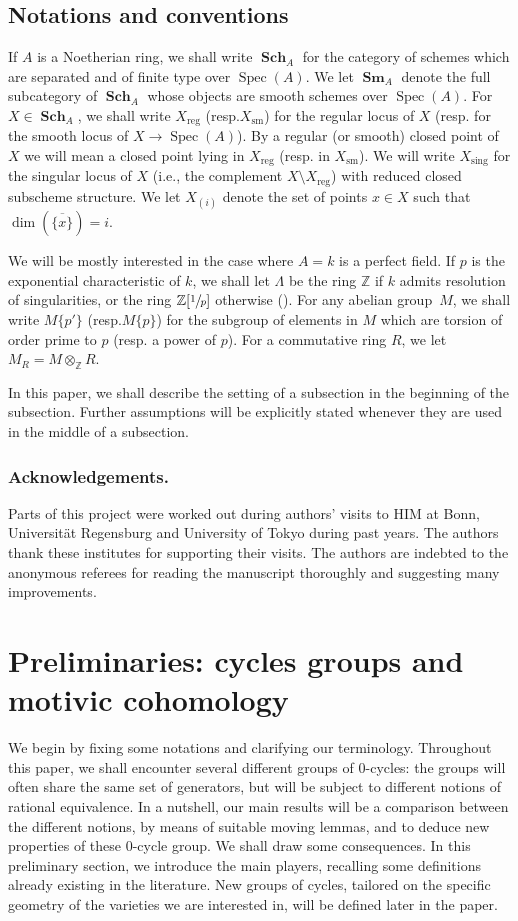 \documentclass[11pt]{article}
\newcommand{\resp}{resp.\xspace}
\numberwithin{equation}{section}
\newcommand{\sm}{\mathrm{sm}}
\theoremstyle{definition}
\newcommand{\Z}{{\mathbb Z}}
\DeclareMathOperator{\Sch}{\mathbf{Sch}}
\DeclareMathOperator{\Sm}{\mathbf{Sm}}
\DeclareMathOperator{\Spec}{Spec}
\newcommand{\reg}{\mathrm{reg}}
\newcommand{\sing}{\mathrm{sing}}
\let\ov\overline
\begin{document}
\subsection*{Notations and conventions}
If $A$ is a Noetherian ring, we shall write $\Sch_A$ for the category
of schemes which are separated and of finite type over $\Spec(A)$.
We let $\Sm_A$ denote the full subcategory of $\Sch_A$ whose objects
are smooth schemes over $\Spec(A)$. For $X\in \Sch_A$, we shall write $X_{\reg}$ (\resp $X_{\sm}$) for the regular locus of $X$ (\resp for the smooth locus of $X\to \Spec(A)$). By a regular (or smooth) closed point of $X$ we will mean a closed point lying in $X_{\reg}$ (\resp in $X_{\sm}$). We will write $X_{\sing}$ for the singular locus of $X$ (i.e., the complement $X \setminus X_{\reg}$) with reduced closed subscheme structure. We let $X_{(i)}$ denote the set of points $x \in X$ such that
$\dim(\ov{\{x\}}) = i$.

We will be mostly interested in the case where $A = k$ is a perfect field.
If $p$ is the exponential characteristic of $k$,
we shall let $\Lambda$ be the ring $\Z$ if $k$ admits resolution of
singularities, or the ring $\Z[\sfrac{1}{p}]$ otherwise (\cite[Def.\,3.4]{FV}).
For any abelian group~$M$, we shall write $M\{p'\}$ (\resp $M\{p\}$) for the subgroup of elements in $M$ which are torsion of order prime to $p$ (\resp a power of $p$). For a commutative ring $R$, we let
$M_R = M \otimes_\Z R$.

In this paper, we shall describe the setting of a subsection in the beginning
of the subsection. Further assumptions will be explicitly stated whenever they are
used in the middle of a subsection.

\subsubsection*{Acknowledgements.}
Parts of this project were worked out during authors' visits to
HIM at Bonn, Universität Regensburg and University of Tokyo
during past years. The authors thank these institutes for supporting their
visits. The authors are indebted to the anonymous referees for reading the manuscript thoroughly and suggesting many improvements.

\section{Preliminaries: cycles groups and
motivic cohomology}\label{sec:set-up}
We begin by fixing some notations and clarifying our terminology.
Throughout this paper, we shall encounter several different groups of $0$-cycles: the groups will often share the same set of generators, but will be subject to different notions of rational equivalence. In a nutshell, our main results will be a comparison between the different notions, by means of suitable moving lemmas, and to deduce new
properties of these $0$-cycle group. We shall draw some consequences.
In this preliminary section, we introduce the main players, recalling some definitions already existing in the literature. New groups of cycles, tailored on the specific geometry of the varieties we are interested in, will be defined later in the paper.
\end{document}
